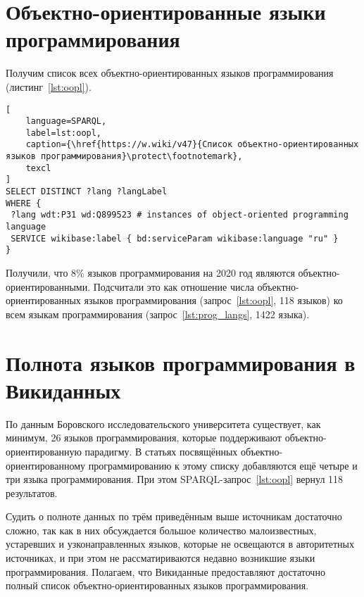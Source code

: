 \newpage
\section{Объектно-ориентированные языки программирования}
Получим список всех объектно-ориентированных языков программирования (листинг~\ref{lst:oopl}).

\begin{lstlisting}[
	language=SPARQL,
	label=lst:oopl,
	caption={\href{https://w.wiki/v47}{Список объектно-ориентированных языков программирования}\protect\footnotemark},
	texcl
]
SELECT DISTINCT ?lang ?langLabel
WHERE {
 ?lang wdt:P31 wd:Q899523 # instances of object-oriented programming language
 SERVICE wikibase:label { bd:serviceParam wikibase:language "ru" }
}
\end{lstlisting}

Получили, что 8\% языков программирования на 2020 год являются объектно-ориентированными. 
Подсчитали это как отношение числа объектно-ориентированных языков программирования 
(запрос~\ref{lst:oopl}, 118 языков) ко всем языкам программирования (запрос~\ref{lst:prog_langs}, 1422 языка).




\section{Полнота языков программирования в Викиданных}
По данным Боровского исследовательского университета\autocite{oo_langs_bourabai} существует, как минимум, 26 языков программирования, которые поддерживают объектно-ориентированную парадигму. В статьях посвящённых объектно-ориентированному программированию к этому списку добавляются ещё четыре\autocite{oo_langs_science_wikia} и три\autocite{oo_langs_garshin} языка программирования. При этом SPARQL-запрос~\ref{lst:oopl} вернул 118 результатов.

Судить о полноте данных по трём приведённым выше источникам достаточно сложно, так как в них обсуждается большое количество малоизвестных, устаревших и узконаправленных языков, которые не освещаются в авторитетных источниках, и при этом не рассматириваются недавно возникшие языки программирования. 
Полагаем, что Викиданные предоставляют достаточно полный список объектно-ориентированных языков программирования.



